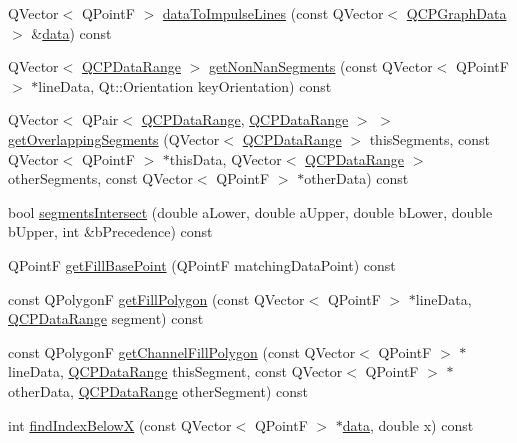 \begin{DoxyCompactItemize}
\item 
Q\+Vector$<$ Q\+PointF $>$ \hyperlink{class_q_c_p_graph_a0aa76bf06582287c7ab3f32a83fd94f1}{data\+To\+Impulse\+Lines} (const Q\+Vector$<$ \hyperlink{class_q_c_p_graph_data}{Q\+C\+P\+Graph\+Data} $>$ \&\hyperlink{class_q_c_p_graph_a04514a2b1fb61a280ead66abe80b89ab}{data}) const 
\item 
Q\+Vector$<$ \hyperlink{class_q_c_p_data_range}{Q\+C\+P\+Data\+Range} $>$ \hyperlink{class_q_c_p_graph_a65584642f9fceae585c4e54a295242c1}{get\+Non\+Nan\+Segments} (const Q\+Vector$<$ Q\+PointF $>$ $\ast$line\+Data, Qt\+::\+Orientation key\+Orientation) const 
\item 
Q\+Vector$<$ Q\+Pair$<$ \hyperlink{class_q_c_p_data_range}{Q\+C\+P\+Data\+Range}, \hyperlink{class_q_c_p_data_range}{Q\+C\+P\+Data\+Range} $>$ $>$ \hyperlink{class_q_c_p_graph_ab0d7cc3285a3b42e735aaeb953ab7d83}{get\+Overlapping\+Segments} (Q\+Vector$<$ \hyperlink{class_q_c_p_data_range}{Q\+C\+P\+Data\+Range} $>$ this\+Segments, const Q\+Vector$<$ Q\+PointF $>$ $\ast$this\+Data, Q\+Vector$<$ \hyperlink{class_q_c_p_data_range}{Q\+C\+P\+Data\+Range} $>$ other\+Segments, const Q\+Vector$<$ Q\+PointF $>$ $\ast$other\+Data) const 
\item 
bool \hyperlink{class_q_c_p_graph_a5dad4a556464c8fa8635a560b3e00a6d}{segments\+Intersect} (double a\+Lower, double a\+Upper, double b\+Lower, double b\+Upper, int \&b\+Precedence) const 
\item 
Q\+PointF \hyperlink{class_q_c_p_graph_a5ea875197f4988c6fdf314259321566f}{get\+Fill\+Base\+Point} (Q\+PointF matching\+Data\+Point) const 
\item 
const Q\+PolygonF \hyperlink{class_q_c_p_graph_a48e9318abd259a1f800f2ccca718785f}{get\+Fill\+Polygon} (const Q\+Vector$<$ Q\+PointF $>$ $\ast$line\+Data, \hyperlink{class_q_c_p_data_range}{Q\+C\+P\+Data\+Range} segment) const 
\item 
const Q\+PolygonF \hyperlink{class_q_c_p_graph_aa112ba720973f714f98588985e51e782}{get\+Channel\+Fill\+Polygon} (const Q\+Vector$<$ Q\+PointF $>$ $\ast$line\+Data, \hyperlink{class_q_c_p_data_range}{Q\+C\+P\+Data\+Range} this\+Segment, const Q\+Vector$<$ Q\+PointF $>$ $\ast$other\+Data, \hyperlink{class_q_c_p_data_range}{Q\+C\+P\+Data\+Range} other\+Segment) const 
\item 
int \hyperlink{class_q_c_p_graph_a6f4e9461d5925be9228fc4760249a04f}{find\+Index\+BelowX} (const Q\+Vector$<$ Q\+PointF $>$ $\ast$\hyperlink{class_q_c_p_graph_a04514a2b1fb61a280ead66abe80b89ab}{data}, double x) const 
\item 

\end{DoxyCompactItemize}
